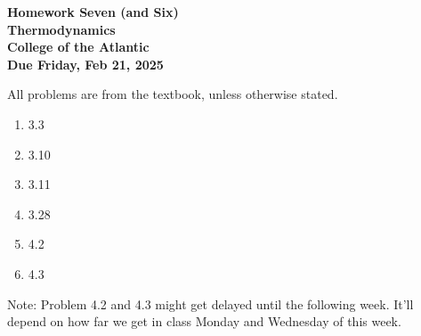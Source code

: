 \documentclass[12pt]{article}
\begin{document}
\pagestyle{empty}
 
\begin{center}
{\LARGE {\bf Homework Seven (and Six)}}\\
\medskip
{\Large {\bf Thermodynamics}}\\
\medskip
{\Large {\bf College of the Atlantic}}\\
\medskip
{ {\bf Due Friday, Feb 21, 2025}}\\  
\end{center}
\medskip


\noindent All problems are from the textbook, unless otherwise stated. 


\begin{enumerate}
  \setlength{\itemsep}{4mm}

\item 3.3
\item 3.10
\item 3.11
\item 3.28
\item 4.2
\item 4.3
   
\end{enumerate}

Note: Problem 4.2 and 4.3 might get delayed until the following
week. It'll depend on how far we get in class Monday and Wednesday of
this week. 
\end{document}
